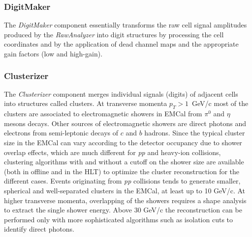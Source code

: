 \subsubsection{DigitMaker} 
The {\it DigitMaker} component essentially transforms the raw cell signal amplitudes
produced by the {\it RawAnalyzer} into digit structures by processing the cell coordinates 
and by the application of dead channel maps and the appropriate gain factors (low and high-gain).

\subsubsection{Clusterizer} 
The {\it Clusterizer} component merges individual signals (digits) of adjacent cells
into  structures called clusters.
At transverse momenta $p_T>1$~GeV/c most of the clusters are associated to electromagnetic 
showers in EMCal  from $\pi^0$ and $\eta$ mesons decays. 
Other sources of electromagnetic showers are direct photons 
and electrons from semi-leptonic decays of $c$ and $b$ hadrons.
Since the typical cluster size in the EMCal can vary according to the detector occupancy due to shower 
overlap effects, which are much different for {\it pp} and heavy-ion collisions, 
clustering algorithms with and without a cutoff on the shower size are available (both in offline and in the HLT)  
to optimize the cluster reconstruction for the different cases. 
Events originating from {\it pp} collisions tends to generate 
smaller, spherical and well-separated clusters in the EMCal, at least up to 10 GeV/c. 
At higher transverse momenta, overlapping of the showers requires a shape analysis 
to extract the single shower energy. 
Above 30 GeV/c the reconstruction can be performed only with more sophisticated 
algorithms such as isolation cuts to identify direct photons.



